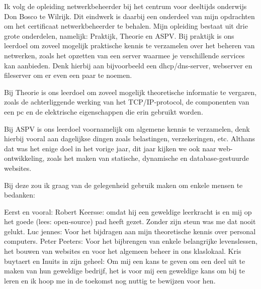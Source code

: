 Ik volg de opleiding netwerkbeheerder bij het centrum voor deeltijds onderwijs Don Bosco te Wilrijk. Dit eindwerk is daarbij een onderdeel van mijn opdrachten om het certificaat netwerkbeheerder te behalen.
Mijn opleiding bestaat uit drie grote onderdelen, namelijk: Praktijk, Theorie en ASPV.
Bij praktijk is ons leerdoel om zoveel mogelijk praktische kennis te verzamelen over het beheren van netwerken, zoals het opzetten van een server waarmee je verschillende services kan aanbieden.
Denk hierbij aan bijvoorbeeld een dhcp/dns-server, webserver en fileserver om er even een paar te noemen.

Bij Theorie is ons leerdoel om zoveel mogelijk theoretische informatie te vergaren, zoals de achterliggende werking van het TCP/IP-protocol, de componenten van een pc en de elektrische eigenschappen die erin gebruikt worden.

Bij ASPV is ons leerdoel voornamelijk om algemene kennis te verzamelen, denk hierbij vooral aan dagelijkse dingen zoals belastingen, verzekeringen, etc.
Althans dat was het enige doel in het vorige jaar, dit jaar kijken we ook naar web-ontwikkeling, zoals het maken van statische, dynamische en database-gestuurde websites.

Bij deze zou ik graag van de gelegenheid gebruik maken om enkele mensen te bedanken:

Eerst en vooral: Robert Keersse: omdat hij een geweldige leerkracht is en mij op het goede (lees: open-source) pad heeft gezet. Zonder zijn steun was me dat nooit gelukt.
Luc jennes: Voor het bijdragen aan mijn theoretische kennis over personal computers.
Peter Peeters: Voor het bijbrengen van enkele belangrijke levenslessen, het bouwen van websites en voor het algemeen beheer in ons klaslokaal.
Kris buytaert en Inuits in zijn geheel: Om mij een kans te geven om een deel uit te maken van hun geweldige bedrijf, het is voor mij een geweldige kans om bij te leren en ik hoop me in de toekomst nog nuttig te bewijzen voor hen.
